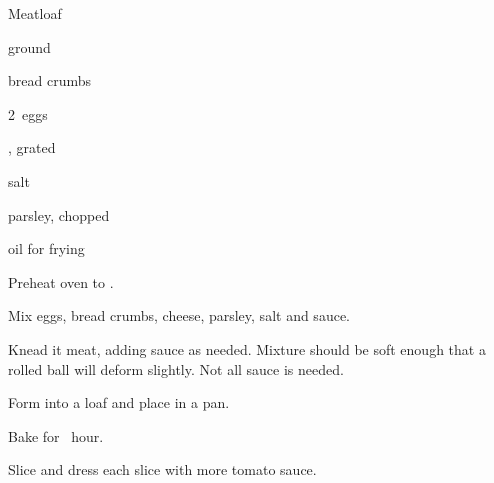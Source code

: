 \begin{recipe}{Meatloaf}{}{}

\begin{ingredients}
\item {} ground 
\item {} bread crumbs
\item 2~eggs
\item {} , grated
\item {} salt
\item parsley, chopped
\item oil for frying
\item {}
\end{ingredients}

\begin{directions}
\item Preheat oven to .
\item Mix eggs, bread crumbs, cheese, parsley, salt and  sauce.
\item Knead it meat, adding sauce as needed. Mixture should be soft enough that a rolled ball will deform slightly. Not all sauce is needed.
\item Form into a loaf and place in a pan.
\item Bake for \half~hour.
\item Slice and dress each slice with more tomato sauce.
\end{directions}
\end{recipe}
